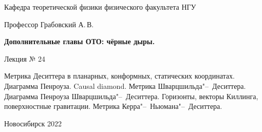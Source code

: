 \documentclass[12pt,pagesize,paper=192mm:108mm,landscape]{scrbook}
\begin{document}
\begin{titlepage}
\begin{center}
    Кафедра теоретической физики физического факультета НГУ
    \medskip

    \Large
    Профессор Грабовский А.\,В.
    \smallskip

    \Large
    \textbf{Дополнительные главы ОТО: чёрные дыры.}
    \smallskip

    \Large
    Лекция № 24
    \vfill

    \normalsize
    \begin{minipage}{0.75\linewidth}
      Метрика Деситтера в планарных, конформных, статических
      координатах. Диаграмма Пенроуза. Causal diamond. Метрика
      Шварцшильда"--~Деситтера. Диаграмма Пенроуза
      Шварцшильда"--~Деситтера. Горизонты, векторы Киллинга,
      поверхностные гравитации. Метрика Керра"--~Ньюмана"--~Деситтера.
     \end{minipage}
    \vfill

    \normalsize \ccbysa\hspace{0.5em}  Новосибирск 2022
  \end{center}
\end{titlepage}
\end{document}
